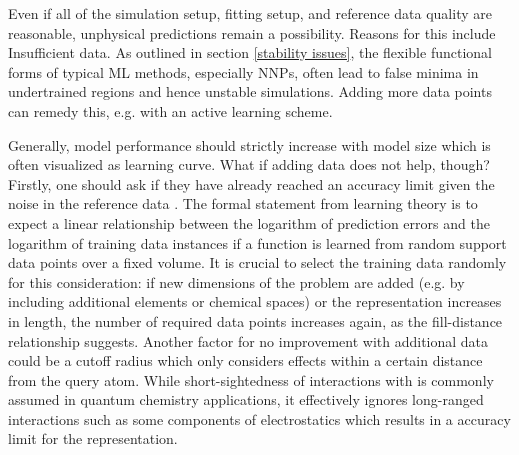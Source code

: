 \documentclass[9pt,bestpractices]{livecoms}
\begin{document}
Even if all of the simulation setup, fitting setup, and reference data quality
are reasonable, unphysical predictions remain a possibility. Reasons for this
include Insufficient data. As outlined in section \ref{stability issues}, the
flexible functional forms of typical ML methods, especially NNPs, often lead to
false minima in undertrained regions and hence unstable simulations. Adding more
data points can remedy this, e.g. with an active learning scheme.

Generally, model performance should strictly increase with model size which is
often visualized as learning curve\cite{vieringShapeLearningCurves2023}. What if
adding data does not help, though? Firstly, one should ask if they have already
reached an accuracy limit given the noise in the reference data
\cite{christensenRoleGradientsMachine2020a}. The formal statement from learning
theory is to expect a linear relationship between the logarithm of prediction
errors and the logarithm of training data instances if a function is learned
from random support data points over a fixed
volume\cite{cortesLearningCurvesAsymptotic1993a}. It is crucial to select the
training data randomly for this consideration: if new dimensions of the problem
are added (e.g. by including additional elements or chemical spaces) or the
representation increases in length, the number of required data points increases
again, as the fill-distance
relationship\cite{madychBoundsMultivariatePolynomials1992} suggests. Another
factor for no improvement with additional data could be a cutoff radius which
only considers effects within a certain distance from the query atom. While
short-sightedness of interactions with is commonly assumed in quantum chemistry
applications\cite{prodanNearsightednessElectronicMatter2005}, it effectively
ignores long-ranged interactions such as some components of electrostatics which
results in a accuracy limit for the representation.

\end{document}
